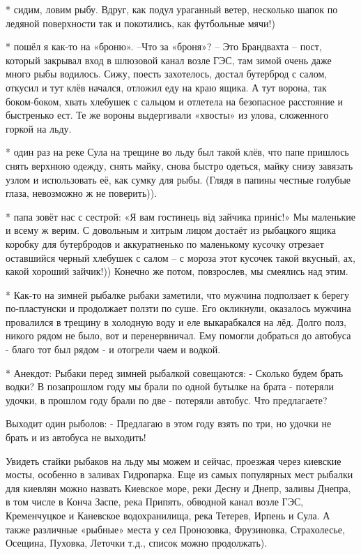 * сидим, ловим рыбу. Вдруг, как подул ураганный ветер, несколько шапок по
ледяной поверхности так и покотились, как футбольные мячи!)

* пошёл я как-то на «броню». –Что за «броня»? – Это Брандвахта – пост, который
закрывал вход в шлюзовой канал возле ГЭС, там зимой очень даже много рыбы
водилось. Сижу, поесть захотелось, достал бутерброд с салом, откусил и тут клёв
начался, отложил еду на краю ящика. А тут ворона, так боком-боком, хвать
хлебушек с сальцом и отлетела на безопасное расстояние и быстренько ест. Те же
вороны выдергивали «хвосты» из улова, сложенного горкой на  льду.

* один раз на реке Сула на трещине во льду был такой клёв, что папе пришлось
снять верхнюю одежду, снять майку, снова быстро одеться, майку снизу завязать
узлом и использовать её, как сумку для рыбы. (Глядя в папины честные голубые
глаза, невозможно ж не поверить)). 

* папа зовёт нас с сестрой: «Я вам гостинець від зайчика приніс!» Мы маленькие
и всему ж верим. С довольным и хитрым лицом достаёт из рыбацкого ящика коробку
для бутербродов и аккуратненько по маленькому кусочку отрезает оставшийся
черный хлебушек с салом – с мороза  этот кусочек такой вкусный, ах, какой
хороший зайчик!)) Конечно же потом, повзрослев, мы смеялись над этим. 

* Как-то на зимней рыбалке рыбаки заметили, что мужчина подползает к берегу
по-пластунски и продолжает ползти по суше. Его окликнули, оказалось мужчина
провалился в трещину в холодную воду и еле выкарабкался на лёд. Долго полз,
никого рядом не было, вот и перенервничал. Ему помогли добраться до автобуса -
благо тот был рядом - и отогрели чаем и водкой.

* Анекдот: Рыбаки перед зимней рыбалкой совещаются: - Сколько будем брать
водки? В позапрошлом году мы брали по одной бутылке на брата - потеряли удочки,
в прошлом году брали по две - потеряли автобус. Что предлагаете? 

Выходит один рыболов: - Предлагаю в этом году взять по три, но удочки не брать
и из автобуса не выходить!

Увидеть стайки рыбаков  на льду мы можем и сейчас, проезжая через киевские
мосты, особенно в заливах Гидропарка. Еще из самых популярных мест рыбалки для
киевлян можно назвать Киевское море, реки Десну и Днепр, заливы Днепра,  в том
числе в Конча Заспе, река Припять, обводной канал возле ГЭС, Кременчуцкое  и
Каневское водохранилища, река Тетерев, Ирпень и Сула. А также различные
«рыбные» места у сел Пронозовка, Фрузиновка, Страхолесье, Осещина, Пуховка,
Леточки т.д., список можно продолжать). 

